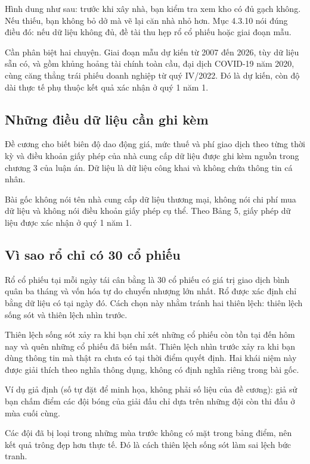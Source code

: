 Hình dung như sau: trước khi xây nhà, bạn kiểm tra xem kho có đủ gạch không. Nếu thiếu, bạn không bỏ dở mà vẽ lại căn nhà nhỏ hơn. Mục 4.3.10 nói đúng điều đó: nếu dữ liệu không đủ, đề tài thu hẹp rổ cổ phiếu hoặc giai đoạn mẫu.

Cần phân biệt hai chuyện. Giai đoạn mẫu dự kiến từ 2007 đến 2026, tùy dữ liệu sẵn có, và gồm khủng hoảng tài chính toàn cầu, đại dịch COVID-19 năm 2020, cùng căng thẳng trái phiếu doanh nghiệp từ quý IV/2022. Đó là dự kiến, còn độ dài thực tế phụ thuộc kết quả xác nhận ở quý 1 năm 1.

\subsection{Những điều dữ liệu cần ghi kèm}

Đề cương cho biết biên độ dao động giá, mức thuế và phí giao dịch theo từng thời kỳ và điều khoản giấy phép của nhà cung cấp dữ liệu được ghi kèm nguồn trong chương 3 của luận án. Dữ liệu là dữ liệu công khai và không chứa thông tin cá nhân.

Bài gốc không nói tên nhà cung cấp dữ liệu thương mại, không nói chi phí mua dữ liệu và không nói điều khoản giấy phép cụ thể. Theo Bảng 5, giấy phép dữ liệu được xác nhận ở quý 1 năm 1.

\subsection{Vì sao rổ chỉ có 30 cổ phiếu}

Rổ cổ phiếu tại mỗi ngày tái cân bằng là 30 cổ phiếu có giá trị giao dịch bình quân ba tháng và vốn hóa tự do chuyển nhượng lớn nhất. Rổ được xác định chỉ bằng dữ liệu có tại ngày đó. Cách chọn này nhằm tránh hai thiên lệch: thiên lệch sống sót và thiên lệch nhìn trước.

Thiên lệch sống sót xảy ra khi bạn chỉ xét những cổ phiếu còn tồn tại đến hôm nay và quên những cổ phiếu đã biến mất. Thiên lệch nhìn trước xảy ra khi bạn dùng thông tin mà thật ra chưa có tại thời điểm quyết định. Hai khái niệm này được giải thích theo nghĩa thông dụng, không có định nghĩa riêng trong bài gốc.

\begin{tcolorbox}[breakable]
Ví dụ giả định (số tự đặt để minh họa, không phải số liệu của đề cương): giả sử bạn chấm điểm các đội bóng của giải đấu chỉ dựa trên những đội còn thi đấu ở mùa cuối cùng.

Các đội đã bị loại trong những mùa trước không có mặt trong bảng điểm, nên kết quả trông đẹp hơn thực tế. Đó là cách thiên lệch sống sót làm sai lệch bức tranh.
\end{tcolorbox}

